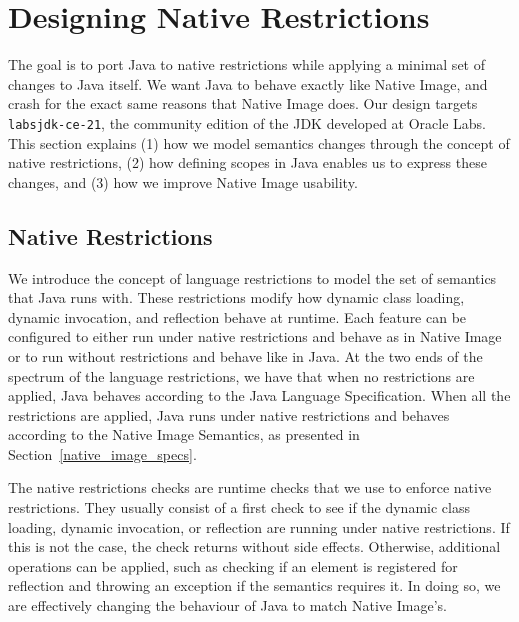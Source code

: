 \chapter{Designing Native Restrictions}

The goal is to port Java to native restrictions while applying a minimal set of changes to Java itself. We want Java to behave exactly like Native Image, and crash for the exact same reasons that Native Image does. Our design targets \verb|labsjdk-ce-21|, the community edition of the JDK developed at Oracle Labs. 
This section explains (1) how we model semantics changes through the concept of native restrictions, (2) how defining scopes in Java enables us to express these changes, and (3) how we improve Native Image usability.

\section{Native Restrictions}
We introduce the concept of language restrictions to model the set of semantics that Java runs with. These restrictions modify how dynamic class loading, dynamic invocation, and reflection behave at runtime. Each feature can be configured to either run under native restrictions and behave as in Native Image or to run without restrictions and behave like in Java.
At the two ends of the spectrum of the language restrictions, we have that when no restrictions are applied, Java behaves according to the Java Language Specification. When all the restrictions are applied, Java runs under native restrictions and behaves according to the Native Image Semantics, as presented in Section~\ref{native_image_specs}. 

The native restrictions checks are runtime checks that we use to enforce native restrictions. They usually consist of a first check to see if the dynamic class loading, dynamic invocation, or reflection are running under native restrictions. If this is not the case, the check returns without side effects. Otherwise, additional operations can be applied, such as checking if an element is registered for reflection and throwing an exception if the semantics requires it. In doing so, we are effectively changing the behaviour of Java to match Native Image's.

